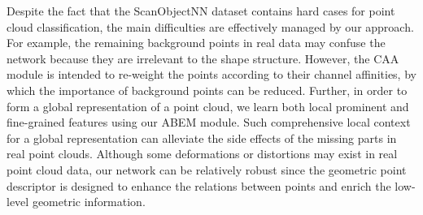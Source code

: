 \documentclass[journal,twoside]{IEEEtran}
\begin{document}
\begin{table}
\begin{center}
\caption{Ablation study about different Geometric Point Descriptor  forms on \emph{ModelNet40} classification accuracy (\%). (: , : , : , : .)}
\end{center}
\end{table}

Despite the fact that the ScanObjectNN dataset contains hard cases for point cloud classification, the main difficulties are effectively managed by our approach. For example, the remaining background points in real data may confuse the network because they are irrelevant to the shape structure. However, the CAA module is intended to re-weight the points according to their channel affinities, by which the importance of background points can be reduced. Further, in order to form a global representation of a point cloud, we learn both local prominent and fine-grained features using our ABEM module. Such comprehensive local context for a global representation can alleviate the side effects of the missing parts in real point clouds. Although some deformations or distortions may exist in real point cloud data, our network can be relatively robust since the geometric point descriptor is designed to enhance the relations between points and enrich the low-level geometric information. 
\end{document}
